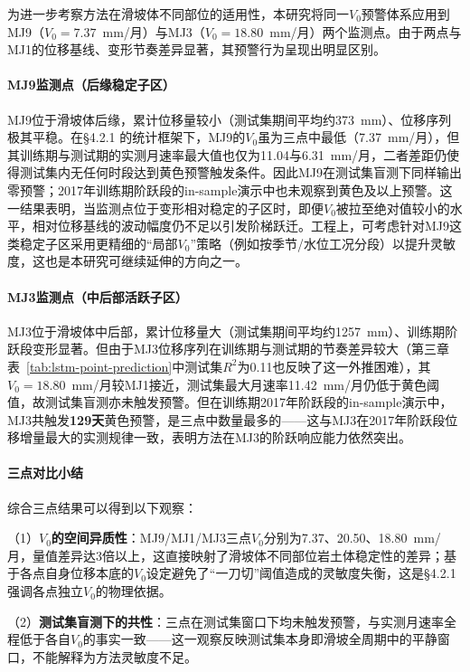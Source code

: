 \documentclass[12pt,a4paper]{article}
\begin{document}
为进一步考察方法在滑坡体不同部位的适用性，本研究将同一$V_0$预警体系应用到MJ9（$V_0=7.37$~mm/月）与MJ3（$V_0=18.80$~mm/月）两个监测点。由于两点与MJ1的位移基线、变形节奏差异显著，其预警行为呈现出明显区别。

\paragraph{\textbf{MJ9监测点（后缘稳定子区）}}

MJ9位于滑坡体后缘，累计位移量较小（测试集期间平均约373~mm）、位移序列极其平稳。在\S4.2.1 的统计框架下，MJ9的$V_0$虽为三点中最低（7.37~mm/月），但其训练期与测试期的实测月速率最大值也仅为11.04与6.31~mm/月，二者差距仍使得测试集内无任何时段达到黄色预警触发条件。因此MJ9在测试集盲测下同样输出零预警；2017年训练期阶跃段的in-sample演示中也未观察到黄色及以上预警。这一结果表明，当监测点位于变形相对稳定的子区时，即便$V_0$被拉至绝对值较小的水平，相对位移基线的波动幅度仍不足以引发阶梯跃迁。工程上，可考虑针对MJ9这类稳定子区采用更精细的“局部$V_0$”策略（例如按季节/水位工况分段）以提升灵敏度，这也是本研究可继续延伸的方向之一。

\paragraph{\textbf{MJ3监测点（中后部活跃子区）}}

MJ3位于滑坡体中后部，累计位移量大（测试集期间平均约1257~mm）、训练期阶跃段变形显著。但由于MJ3位移序列在训练期与测试期的节奏差异较大（第三章表~\ref{tab:lstm-point-prediction}中测试集$R^2$为0.11也反映了这一外推困难），其$V_0 = 18.80$~mm/月较MJ1接近，测试集最大月速率11.42~mm/月仍低于黄色阈值，故测试集盲测亦未触发预警。但在训练期2017年阶跃段的in-sample演示中，MJ3共触发\textbf{129天}黄色预警，是三点中数量最多的——这与MJ3在2017年阶跃段位移增量最大的实测规律一致，表明方法在MJ3的阶跃响应能力依然突出。

\paragraph{\textbf{三点对比小结}}

综合三点结果可以得到以下观察：

    （1）\textbf{$V_0$的空间异质性}：MJ9/MJ1/MJ3三点$V_0$分别为7.37、20.50、18.80~mm/月，量值差异达3倍以上，这直接映射了滑坡体不同部位岩土体稳定性的差异；基于各点自身位移本底的$V_0$设定避免了“一刀切”阈值造成的灵敏度失衡，这是\S4.2.1 强调各点独立$V_0$的物理依据。

    （2）\textbf{测试集盲测下的共性}：三点在测试集窗口下均未触发预警，与实测月速率全程低于各自$V_0$的事实一致——这一观察反映测试集本身即滑坡全周期中的平静窗口，不能解释为方法灵敏度不足。
\end{document}
